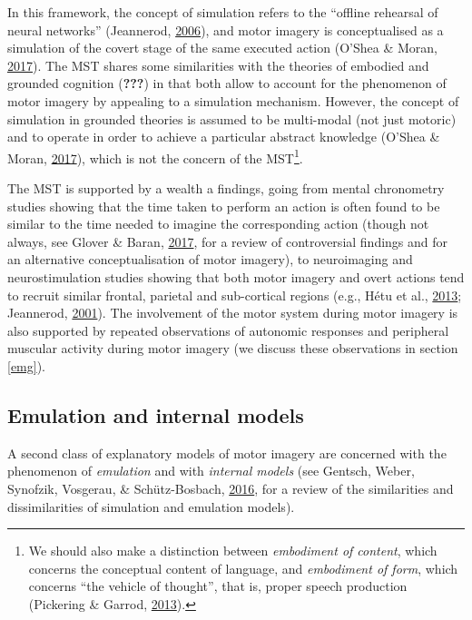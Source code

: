 \documentclass[a4paper,12pt,twoside,openright,oldfontcommands]{memoir}
\let\rmarkdownfootnote\footnote%
\def\footnote{\protect\rmarkdownfootnote}
\begin{document}
In this framework, the concept of simulation refers to the ``offline
rehearsal of neural networks'' (Jeannerod,
\protect\hyperlink{ref-jeannerod_motor_2006}{2006}), and motor imagery
is conceptualised as a simulation of the covert stage of the same
executed action (O'Shea \& Moran,
\protect\hyperlink{ref-oshea_does_2017}{2017}). The MST shares some
similarities with the theories of embodied and grounded cognition
({\textbf{???}}) in that both allow to account for the phenomenon of
motor imagery by appealing to a simulation mechanism. However, the
concept of simulation in grounded theories is assumed to be multi-modal
(not just motoric) and to operate in order to achieve a particular
abstract knowledge (O'Shea \& Moran,
\protect\hyperlink{ref-oshea_does_2017}{2017}), which is not the concern
of the MST\footnote{We should also make a distinction between
  \emph{embodiment of content}, which concerns the conceptual content of
  language, and \emph{embodiment of form}, which concerns ``the vehicle
  of thought'', that is, proper speech production (Pickering \& Garrod,
  \protect\hyperlink{ref-pickering_integrated_2013}{2013}).}.

The MST is supported by a wealth a findings, going from mental
chronometry studies showing that the time taken to perform an action is
often found to be similar to the time needed to imagine the
corresponding action (though not always, see Glover \& Baran,
\protect\hyperlink{ref-glover_motor-cognitive_2017}{2017}, for a review
of controversial findings and for an alternative conceptualisation of
motor imagery), to neuroimaging and neurostimulation studies showing
that both motor imagery and overt actions tend to recruit similar
frontal, parietal and sub-cortical regions (e.g., Hétu et al.,
\protect\hyperlink{ref-hetu_neural_2013}{2013}; Jeannerod,
\protect\hyperlink{ref-jeannerod_neural_2001}{2001}). The involvement of
the motor system during motor imagery is also supported by repeated
observations of autonomic responses and peripheral muscular activity
during motor imagery (we discuss these observations in section
\ref{emg}).

\subsection{Emulation and internal
models}\label{emulation-and-internal-models}

A second class of explanatory models of motor imagery are concerned with
the phenomenon of \emph{emulation} and with \emph{internal models} (see
Gentsch, Weber, Synofzik, Vosgerau, \& Schütz-Bosbach,
\protect\hyperlink{ref-gentsch_towards_2016}{2016}, for a review of the
similarities and dissimilarities of simulation and emulation models).
\end{document}

